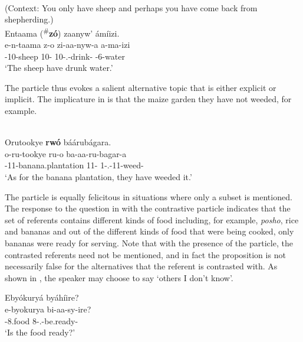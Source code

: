 \documentclass[output=paper]{langscibook}
\begin{document}
\ea
\label{bkm:Ref37772311}
\citep[8]{AsiimwevanderWal2021}\\
(Context: You only have sheep and perhaps you have come back from shepherding.)\\
Entaama (\textsuperscript{\#}\textbf{zó}) zaanyw’ ámíizi.\\
\gll
e-n-taama  z-o  zi-aa-nyw-a  a-ma-izi\\
\AUG{}-10-sheep  10-\CM{}  10\SM{}-\N{}.\PST{}-{}drink-\FV{}  \AUG{}-{}6-water\\
\glt
`The sheep have drunk water.’\\


\z


The particle thus evokes a salient alternative topic that is either explicit or implicit. The implicature in  is that the maize garden they have not weeded, for example.

\ea
\label{bkm:Ref113716525}
\citep[11]{AsiimwevanderWal2021}\\
Orutookye \textbf{rwó} báárubágara.\\
\gll
o-ru-tookye  ru-o  ba-aa-ru-bagar-a\\
\AUG{}-11-banana.plantation  11-\CM{}  1\SM{}-\N{}.\PST{}-11\OM{}-weed-\FV{}\\
\glt
`As for the banana plantation, they have weeded it.’\\


\z


The particle is equally felicitous in situations where only a subset is mentioned. The response  to the question in  with the contrastive particle indicates that the set of referents contains different kinds of food including, for example, \textit{posho}, rice and bananas and out of the different kinds of food that were being cooked, only bananas were ready for serving. Note that with the presence of the particle, the contrasted referents need not be mentioned, and in fact the proposition is not necessarily false for the alternatives that the referent is contrasted with. As shown in , the speaker may choose to say ‘others I don’t know’.

\ea
\label{bkm:Ref113716593}
\ea
\label{bkm:Ref113716593:a}
Ebyókuryá byáhíire?\\
\gll
e-byokurya  bi-aa-sy-ire?\\
\AUG{}-8.food  8\SM{}-\N{}.\PST{}-be.ready-\PFV{}\\
\glt
‘Is the food ready?’\\
\end{document}
